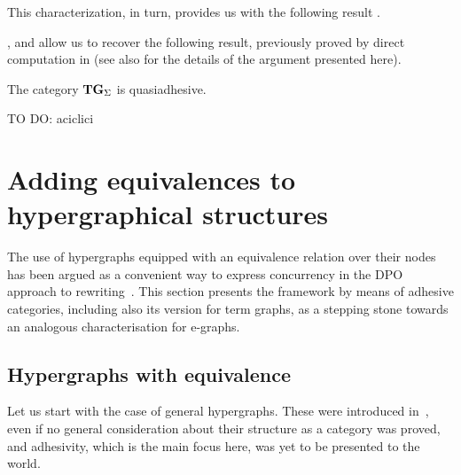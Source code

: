 \documentclass[3p]{elsarticle}
\newcommand{\catname}[1]{\textbf{\textup{#1}}}
\newcommand{\hyp}{\catname{Hyp}}
\newcommand{\tg}[0]{\catname{TG}_{\Sigma}}
\theoremstyle{remark}
\theoremstyle{definition}
\begin{document}
This characterization, in turn, provides us with the following result \cite{CastelnovoGM24,castelnovo2023thesis}. 



,  and  allow us to recover the following result, previously proved by direct computation in \cite[Thm.~4.2]{CorradiniG05} (see also \cite[Cor.~5.15]{CastelnovoGM24} for the details of the argument presented here).
\begin{cor}\label{cor:term}
	The category $\tg$ is quasiadhesive.
\end{cor}

TO DO: aciclici

\section{Adding equivalences to hypergraphical structures}
\label{hypereq}
The use of hypergraphs equipped with an equivalence relation over their nodes has been argued as a convenient way to express concurrency in the DPO approach to rewriting~\cite{concur2006}.
This section presents the framework by means of adhesive categories, including also its version for term graphs, as a stepping stone towards an analogous characterisation for e-graphs.

\subsection{Hypergraphs with equivalence}

Let us start with the case of general hypergraphs. These were introduced in~\cite{concur2006}, even if no general consideration about their structure as a category was proved, and adhesivity, 
which is the main focus here, was yet to be presented to the world.
\end{document}
